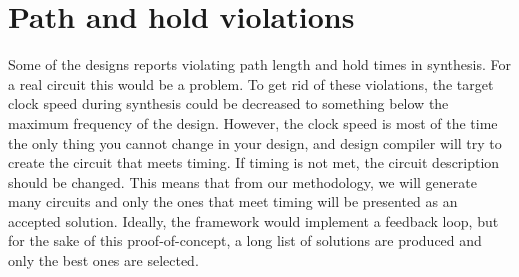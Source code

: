 \section{Path and hold violations}
Some of the designs reports violating path length and hold times in synthesis. For a real circuit this would be a problem. To get rid of these violations, the target clock speed during synthesis could be decreased to something below the maximum frequency of the design. However, the clock speed is most of the time the only thing you cannot change in your design, and design compiler will try to create the circuit that meets timing. If timing is not met, the circuit description should be changed. This means that from our methodology, we will generate many circuits and only the ones that meet timing will be presented as an accepted solution. Ideally, the framework would implement a feedback loop, but for the sake of this proof-of-concept, a long list of solutions are produced and only the best ones are selected.
